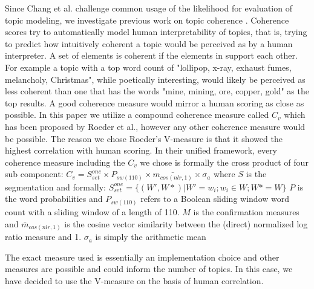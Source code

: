 \documentclass[12pt,journal,letterpaper,oneside,onecolumn]{IEEEtran}
\begin{document}
Since Chang et al.\cite{ref_lda_human_evaluation} challenge common usage of the likelihood for evaluation of topic modeling, we investigate previous work on topic coherence\cite{ref_lda_coh_exploring} \cite{ref_lda_coh_1} \cite{ref_lda_coh_2} \cite{ref_lda_coh_3}.
Coherence scores try to automatically model human interpretability of topics, that is, trying to predict how intuitively coherent a topic would be perceived as by a human interpreter. 
A set of elements is coherent if the elements in support each other.
For example a topic with a top word count of "lollipop, x-ray, exhaust fumes, melancholy, Christmas", while poetically interesting, would likely be perceived as less coherent than one that has the words "mine, mining, ore, copper, gold" as the top results.
A good coherence measure would mirror a human scoring as close as possible.
In this paper we utilize a compound coherence measure called $C_v$ which has been proposed by Roeder et al.\cite{ref_lda_coh_exploring}, however any other coherence measure would be possible.
The reason we chose Roeder's V-measure is that it showed the highest correlation with human scoring.
In their unified framework, every coherence measure including the  $C_v$ we chose is formally the cross product of four sub component: $C_v  = S^{one}_{set} \times P_{sw(110)} \times \bar{m_{cos(nlr,1)}} \times \sigma_a$ where $S$ is the segmentation and formally:
$S^{one}_{set} = \Big\{ (W', W*) | W' = {w_i}; w_i \in W; W* = W \Big\}$
$P$ is the word probabilities and  $P_{sw(110)}$ refers to a Boolean sliding window word count with a sliding window of a length of 110. 
$M$ is the confirmation measures and $\bar{m}_{cos(nlr,1)}$ is the cosine vector similarity between the (direct) normalized log ratio measure and 1.
$\sigma_a$ is simply the arithmetic mean

The exact measure used is essentially an implementation choice and other measures are possible and could inform the number of topics. In this case, we have decided to use the V-measure on the basis of human correlation.
\end{document}

